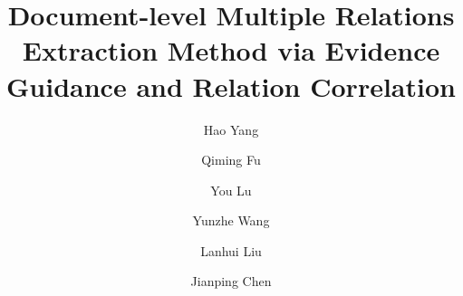 \documentclass[preprint,12pt]{elsarticle}
\begin{document}
\begin{frontmatter}



\title{Document-level Multiple Relations Extraction Method via Evidence Guidance and Relation Correlation}


\author[label1,label2]{Hao Yang}
\author[label1,label2]{Qiming Fu}
\author[label1,label2]{You Lu}
\author[label1,label2]{Yunzhe Wang}
\author[label3]{Lanhui Liu}
\author[label1,label2,label3]{Jianping Chen}

\address[label1]{School of Electronic and Information Engineering, Suzhou University of Science and Technology, Suzhou, Jiangsu 215009, China}
\address[label2]{Jiangsu Province Key Laboratory of Intelligent Energy Efficiency, Suzhou University of Science and Technology, Suzhou, Jiangsu 215009, China}
\address[label3]{Chongqing Industrial Big Data Innovation Center Co., Ltd., Chongqing 400707, China}


\end{frontmatter}
\end{document}
